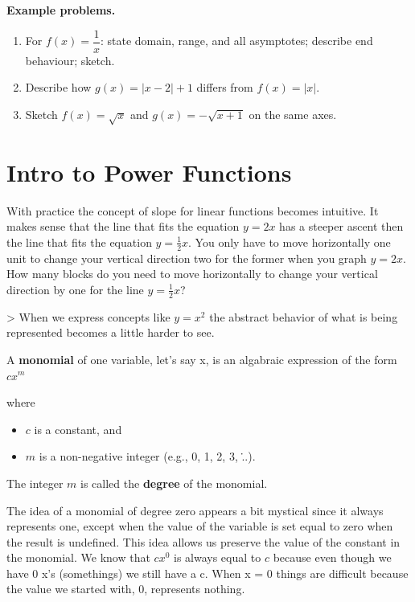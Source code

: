 \textbf{Example problems.}
\begin{enumerate}
    \item For $f(x)=\dfrac{1}{x}$: state domain, range, and all
          asymptotes; describe end behaviour; sketch.
    \item Describe how $g(x)=|x-2|+1$ differs from $f(x)=|x|$.
    \item Sketch $f(x)=\sqrt{x}$ and $g(x)=-\sqrt{x+1}$ on the same
          axes.
\end{enumerate}



\section{Intro to Power Functions}
\label{sec:intr-1105}


With practice the concept of slope for linear functions becomes intuitive. It makes sense
that the line that fits the equation $y=2x$ has a steeper ascent then the line that fits
the equation $y=\frac{1}{2}x$. You only have to move horizontally one unit to change your
vertical direction two for the former when you graph $y=2x$. How many blocks do you need
to move horizontally to change your vertical direction by one for the line
$y=\frac{1}{2}x$?



> When we express concepts like $y=x^2$ the abstract behavior of what is being represented
becomes a little harder to see.



A \textbf{monomial} of one variable, let's say x, is an algabraic expression of the form $c x^m $



where



\begin{itemize}
    \item $c$ is a constant, and
    \item $m$ is a non-negative integer (e.g., 0, 1, 2, 3, \...).
\end{itemize}

The integer $m$ is called the \textbf{degree} of the monomial.



The idea of a monomial of degree zero appears a bit mystical since it always represents
one, except when the value of the variable is set equal to zero when the result is
undefined. This idea allows us preserve the value of the constant in the monomial. We know
that $cx^0$ is always equal to $c$ because even though we have 0 x's (somethings) we still
have a c. When x = 0 things are difficult because the value we started with, 0, represents
nothing.




